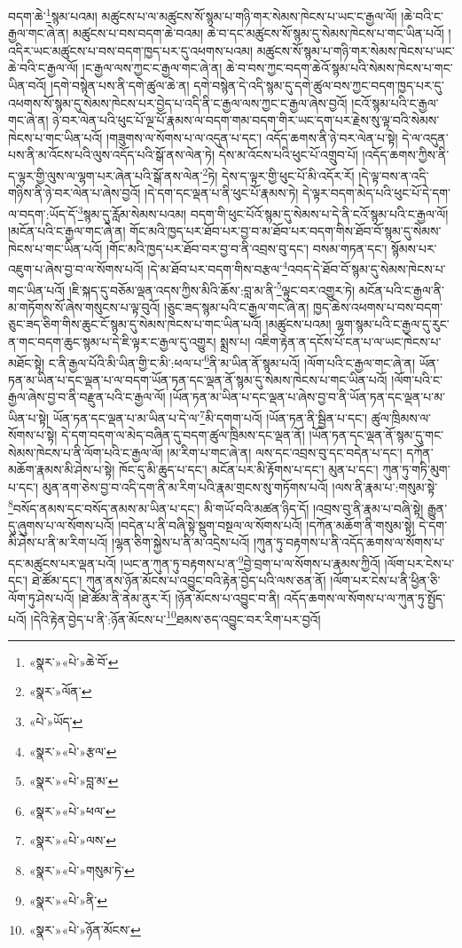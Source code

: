 བདག་ཆེ་\footnote{«སྣར་»«པེ་»ཆེ་བོ་}སྙམ་པའམ། མཚུངས་པ་ལ་མཚུངས་སོ་སྙམ་པ་གཉི་གར་སེམས་ཁེངས་པ་ཡང་ང་རྒྱལ་ལོ། །ཆེ་བའི་ང་རྒྱལ་གང་ཞེ་ན། མཚུངས་པ་བས་བདག་ཆེ་བའམ། ཆེ་བ་དང་མཚུངས་སོ་སྙམ་དུ་སེམས་ཁེངས་པ་གང་ཡིན་པའོ། །འདིར་ཡང་མཚུངས་པ་བས་བདག་ཁྱད་པར་དུ་འཕགས་པའམ། མཚུངས་སོ་སྙམ་པ་གཉི་གར་སེམས་ཁེངས་པ་ཡང་ཆེ་བའི་ང་རྒྱལ་ལོ། །ང་རྒྱལ་ལས་ཀྱང་ང་རྒྱལ་གང་ཞེ་ན། ཆེ་བ་བས་ཀྱང་བདག་ཆེའོ་སྙམ་པའི་སེམས་ཁེངས་པ་གང་ཡིན་བའོ། །དགེ་བསྙེན་པས་ནི་དགེ་ཚུལ་ཆེ་ན། དགེ་བསྙེན་དེ་འདི་སྙམ་དུ་དགེ་ཚུལ་བས་ཀྱང་བདག་ཁྱད་པར་དུ་འཕགས་སོ་སྙམ་དུ་སེམས་ཁེངས་པར་བྱེད་པ་འདི་ནི་ང་རྒྱལ་ལས་ཀྱང་ང་རྒྱལ་ཞེས་བྱའོ། །ངའོ་སྙམ་པའི་ང་རྒྱལ་གང་ཞེ་ན། ཉེ་བར་ལེན་པའི་ཕུང་པོ་ལྔ་པོ་རྣམས་ལ་བདག་གམ་བདག་གིར་ཡང་དག་པར་རྗེས་སུ་ལྟ་བའི་སེམས་ཁེངས་པ་གང་ཡིན་པའོ། །གཟུགས་ལ་སོགས་པ་ལ་འདུན་པ་དང་། འདོད་ཆགས་ནི་ཉེ་བར་ལེན་པ་སྟེ། དེ་ལ་འདུན་པས་ནི་མ་འོངས་པའི་ལུས་འདོད་པའི་སྒོ་ནས་ལེན་ཏེ། དེས་མ་འོངས་པའི་ཕུང་པོ་འགྲུབ་པོ། །འདོད་ཆགས་ཀྱིས་ནི་ད་ལྟར་གྱི་ལུས་ལ་ལྷག་པར་ཞེན་པའི་སྒོ་ནས་ལེན་\footnote{«སྣར་»ལོན་}ཏེ། དེས་ད་ལྟར་གྱི་ཕུང་པོ་མི་འདོར་རོ། །དེ་ལྟ་བས་ན་འདི་གཉིས་ནི་ཉེ་བར་ལེན་པ་ཞེས་བྱའོ། །དེ་དག་དང་ལྡན་པ་ནི་ཕུང་པོ་རྣམས་ཏེ། དེ་ལྟར་བདག་མེད་པའི་ཕུང་པོ་དེ་དག་ལ་བདག་:ཡོད་དོ་\footnote{«པེ་»ཡོད་}སྙམ་དུ་རློམ་སེམས་པའམ། བདག་གི་ཕུང་པོའོ་སྙམ་དུ་སེམས་པ་དེ་ནི་ངའོ་སྙམ་པའི་ང་རྒྱལ་ལོ། །མངོན་པའི་ང་རྒྱལ་གང་ཞེ་ན། གོང་མའི་ཁྱད་པར་ཐོབ་པར་བྱ་བ་མ་ཐོབ་པར་བདག་གིས་ཐོབ་བོ་སྙམ་དུ་སེམས་ཁེངས་པ་གང་ཡིན་པའོ། །གོང་མའི་ཁྱད་པར་ཐོབ་བར་བྱ་བ་ནི་འབྲས་བུ་དང་། བསམ་གཏན་དང་། སྙོམས་པར་འཇུག་པ་ཞེས་བྱ་བ་ལ་སོགས་པའོ། །དེ་མ་ཐོབ་པར་བདག་གིས་བརྩལ་\footnote{«སྣར་»«པེ་»རྩལ་}འབད་དེ་ཐོབ་བོ་སྙམ་དུ་སེམས་ཁེངས་པ་གང་ཡིན་པའོ། །ཇི་སྐད་དུ་བཅོམ་ལྡན་འདས་ཀྱིས་མིའི་ཆོས་:བླ་མ་ནི་\footnote{«སྣར་»«པེ་»བླ་མ་}ལྟུང་བར་འགྱུར་ཏེ། མངོན་པའི་ང་རྒྱལ་ནི་མ་གཏོགས་སོ་ཞེས་གསུངས་པ་ལྟ་བུའོ། །ཅུང་ཟད་སྙམ་པའི་ང་རྒྱལ་གང་ཞེ་ན། ཁྱད་ཆེས་འཕགས་པ་བས་བདག་ཅུང་ཟད་ཅིག་གིས་ཆུང་ངོ་སྙམ་དུ་སེམས་ཁེངས་པ་གང་ཡིན་པའོ། །མཚུངས་པའམ། ལྷག་སྙམ་པའི་ང་རྒྱལ་དུ་རུང་ན་གང་བདག་ཆུང་སྙམ་པ་དེ་ཇི་ལྟར་ང་རྒྱལ་དུ་འགྱུར། སྨྲས་པ། འཇིག་རྟེན་ན་དངོས་པོ་ངན་པ་ལ་ཡང་ཁེངས་པ་མཐོང་སྟེ། ང་ནི་རྒྱལ་པོའི་མི་ཡིན་གྱི་ང་མི་:ཕལ་པ་\footnote{«སྣར་»«པེ་»ཕལ་}ནི་མ་ཡིན་ནོ་སྙམ་པའོ། །ལོག་པའི་ང་རྒྱལ་གང་ཞེ་ན། ཡོན་ཏན་མ་ཡིན་པ་དང་ལྡན་པ་ལ་བདག་ཡོན་ཏན་དང་ལྡན་ནོ་སྙམ་དུ་སེམས་ཁེངས་པ་གང་ཡིན་པའོ། །ལོག་པའི་ང་རྒྱལ་ཞེས་བྱ་བ་ནི་བརྫུན་པའི་ང་རྒྱལ་ལོ། །ཡོན་ཏན་མ་ཡིན་པ་དང་ལྡན་པ་ཞེས་བྱ་བ་ནི་ཡོན་ཏན་དང་ལྡན་པ་མ་ཡིན་པ་སྟེ། ཡོན་ཏན་དང་ལྡན་པ་མ་ཡིན་པ་དེ་ལ་\footnote{«སྣར་»«པེ་»ལས་}མི་དགག་པའོ། །ཡོན་ཏན་ནི་སྦྱིན་པ་དང་། ཚུལ་ཁྲིམས་ལ་སོགས་པ་སྟེ། དེ་དག་བདག་ལ་མེད་བཞིན་དུ་བདག་ཚུལ་ཁྲིམས་དང་ལྡན་ནོ། །ཡོན་ཏན་དང་ལྡན་ནོ་སྙམ་དུ་གང་སེམས་ཁེངས་པ་ནི་ལོག་པའི་ང་རྒྱལ་ལོ། །མ་རིག་པ་གང་ཞེ་ན། ལས་དང་འབྲས་བུ་དང་བདེན་པ་དང་། དཀོན་མཆོག་རྣམས་མི་ཤེས་པ་སྟེ། ཁོང་དུ་མི་ཆུད་པ་དང་། མངོན་པར་མི་རྟོགས་པ་དང་། མུན་པ་དང་། ཀུན་ཏུ་གཏི་མུག་པ་དང་། མུན་ནག་ཅེས་བྱ་བ་འདི་དག་ནི་མ་རིག་པའི་རྣམ་གྲངས་སུ་གཏོགས་པའོ། །ལས་ནི་རྣམ་པ་:གསུམ་སྟེ་\footnote{«སྣར་»«པེ་»གསུམ་ཏེ་}བསོད་ནམས་དང་བསོད་ནམས་མ་ཡིན་པ་དང་། མི་གཡོ་བའི་མཚན་ཉིད་དོ། །འབྲས་བུ་ནི་རྣམ་པ་བཞི་སྟེ། རྒྱུན་དུ་ཞུགས་པ་ལ་སོགས་པའོ། །བདེན་པ་ནི་བཞི་སྟེ་སྡུག་བསྔལ་ལ་སོགས་པའོ། །དཀོན་མཆོག་ནི་གསུམ་སྟེ། དེ་དག་མི་ཤེས་པ་ནི་མ་རིག་པའོ། །ལྷན་ཅིག་སྐྱེས་པ་ནི་མ་འདྲེས་པའོ། །ཀུན་ཏུ་བརྟགས་པ་ནི་འདོད་ཆགས་ལ་སོགས་པ་དང་མཚུངས་པར་ལྡན་པའོ། །ཡང་ན་ཀུན་ཏུ་བརྟགས་པ་ན་\footnote{«སྣར་»«པེ་»ནི་}བྱེ་བྲག་པ་ལ་སོགས་པ་རྣམས་ཀྱིའོ། །ལོག་པར་ངེས་པ་དང་། ཐེ་ཚོམ་དང་། ཀུན་ནས་ཉོན་མོངས་པ་འབྱུང་བའི་རྟེན་བྱེད་པའི་ལས་ཅན་ནོ། །ལོག་པར་ངེས་པ་ནི་ཕྱིན་ཅི་ལོག་ཏུ་ཤེས་པའོ། །ཐེ་ཚོམ་ནི་ནེམ་ནུར་རོ། །ཉོན་མོངས་པ་འབྱུང་བ་ནི། འདོད་ཆགས་ལ་སོགས་པ་ལ་ཀུན་ཏུ་སྤྱོད་པའོ། །དེའི་རྟེན་བྱེད་པ་ནི་:ཉོན་མོངས་པ་\footnote{«སྣར་»«པེ་»ཉོན་མོངས་}ཐམས་ཅད་འབྱུང་བར་རིག་པར་བྱའོ། 